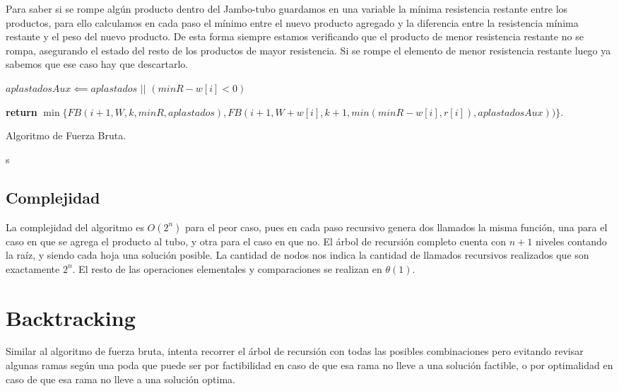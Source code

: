\documentclass[10pt,a4paper]{article}
\begin{document}
Para saber si se rompe algún producto dentro del Jambo-tubo guardamos en una variable la mínima resistencia restante entre los productos, para ello calculamos en cada paso el mínimo entre el nuevo producto agregado y la diferencia entre la resistencia mínima restante y el peso del nuevo producto. De esta forma siempre estamos verificando que el producto de menor resistencia restante no se rompa, asegurando el estado del resto de los productos de mayor resistencia. Si se rompe el elemento de menor resistencia restante luego ya sabemos que ese caso hay que descartarlo.

\begin{algorithm}
	\begin{algorithmic}[1]
		\EndIf
		
		\State $aplastadosAux \impliedby aplastados$ $||$ $(minR - w[i] < 0)$ 
		
		\State \textbf{return} $\min \{ FB(i+1, W, k, minR, aplastados), FB(i+1, W+w[i], k+1, min(minR - w[i], r[i]), aplastadosAux)) \}$.
		\EndFunction
	\end{algorithmic}
	\caption{Algoritmo de Fuerza Bruta.}
	\label{alg:fuerza_bruta}
\end{algorithm}
s 	

\subsection{Complejidad}
La complejidad del algoritmo es $O(2^n)$ para el peor caso, pues en cada paso recursivo genera dos llamados la misma función, una para el caso en que se agrega el producto al tubo, y otra para el caso en que no. El árbol de recursión completo cuenta con $n + 1$ niveles contando la raíz, y siendo cada hoja una solución posible. La cantidad de nodos nos indica la cantidad de llamados recursivos realizados que son exactamente $2^n$.
El resto de las operaciones elementales y comparaciones se realizan en $\theta(1)$.

\section{Backtracking} \label{sec:backtracking}
Similar al algoritmo de fuerza bruta, intenta recorrer el árbol de recursión con todas las posibles combinaciones pero evitando revisar algunas ramas según una poda que puede ser por factibilidad en caso de que esa rama no lleve a una solución factible, o por optimalidad en caso de que esa rama no lleve a una solución optima.
\end{document}
